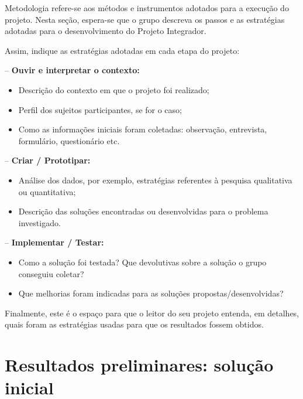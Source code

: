 Metodologia refere-se aos métodos e instrumentos adotados para a execução do
projeto. Nesta seção, espera-se que o grupo descreva os passos e as
estratégias adotadas para o desenvolvimento do Projeto Integrador.

Assim, indique as estratégias adotadas em cada etapa do projeto:

\noindent -- \textbf{Ouvir e interpretar o contexto:}

\begin{itemize}
    \item Descrição do contexto em que o projeto foi realizado;
    \item Perfil dos sujeitos participantes, se for o caso;
    \item Como as informações iniciais foram coletadas: observação,
          entrevista, formulário, questionário etc.
\end{itemize}

\noindent -- \textbf{Criar / Prototipar:}

\begin{itemize}
    \item Análise dos dados, por exemplo, estratégias referentes à pesquisa
          qualitativa ou quantitativa;
    \item Descrição das soluções encontradas ou desenvolvidas para o problema
          investigado.
\end{itemize}

\noindent -- \textbf{Implementar / Testar:}

\begin{itemize}
    \item Como a solução foi testada? Que devolutivas sobre a solução o
          grupo conseguiu coletar?
    \item Que melhorias foram indicadas para as soluções
          propostas/desenvolvidas?
\end{itemize}

Finalmente, este é o espaço para que o leitor do seu projeto entenda, em
detalhes, quais foram as estratégias usadas para que os resultados fossem
obtidos.

\section{Resultados preliminares: solução inicial}\label{sec:resultados}


